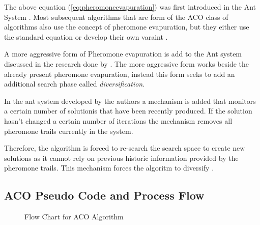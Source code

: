 The above equation (\ref{eq:pheromoneevapuration}) was first introduced in the Ant System \cite{CompuIntelligenceIntro,AntsAndStigmergy,AntIntroTrends,AntSurvey}. Most subsequent algorithms that are form of the ACO class of algorithms also use the concept of pheromone evapuration, but they either use the standard equation or develop their own varaint \cite{CompuIntelligenceIntro,AntsAndStigmergy,AntIntroTrends,AntSurvey}.

A more aggressive form of Pheromone evapuration  is add to the Ant system discussed in the research done by \cite{AntQAP}. The more aggressive form works beside the already present pheromone evapuration, instead this form seeks to add an additional search phase called \emph{diversification}. 

In the ant system developed by the authors a mechanism is added that monitors a certain number of solutionis that have been recently produced. If the solution hasn't changed a certain number of iterations the mechanism removes all pheromone trails currently in the system. 

Therefore, the algorithm is forced to re-search the search space to create new solutions as it cannot rely on previous historic information provided by the pheromone trails. This mechanism forces the algoritm to diversify \cite{AntQAP}.
\subsection{ACO Pseudo Code and Process Flow}
\begin{figure}[htbp!]
	\begin{center}
	\caption{Flow Chart for ACO Algorithm}
	\label{fig:ACOAlgorithmFlowChart}
	\end{center}
\end{figure}
